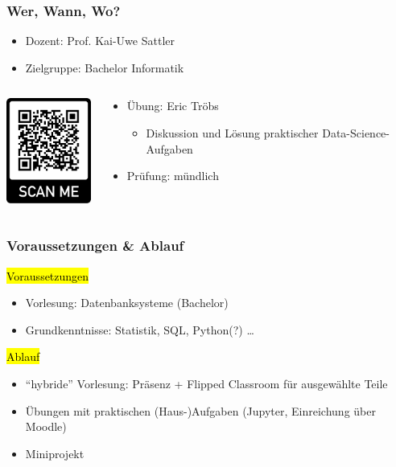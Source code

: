 \begin{frame}

    \frametitle{Wer, Wann, Wo?}
  
    \begin{itemize}
      \item Dozent: Prof. Kai-Uwe Sattler
      \item Zielgruppe: Bachelor Informatik
    \end{itemize}

    \begin{columns}
      \begin{column}{0.3\textwidth}
          \begin{center}
           \includegraphics[width=3cm]{fig1/qr-ds1.png}
           \end{center}
      \end{column}
      \begin{column}{0.7\textwidth}
    \begin{itemize}
    \item Übung: Eric Tröbs
      \begin{itemize}
      \item Diskussion und Lösung praktischer Data-Science-Aufgaben
      \end{itemize}
    \item Prüfung: mündlich
    \end{itemize}
  \end{column}
\end{columns}
\end{frame}
  
  
  \begin{frame}
  
    \frametitle{Voraussetzungen \& Ablauf}
  
  \hl{Voraussetzungen}
  \begin{itemize}
  \item Vorlesung: Datenbanksysteme (Bachelor)
  \item Grundkenntnisse: Statistik, SQL, Python(?) \dots
  \end{itemize}


  \hl{Ablauf}
  \begin{itemize}
    \item "`hybride"' Vorlesung: Präsenz + Flipped Classroom für ausgewählte Teile
    \item Übungen mit praktischen (Haus-)Aufgaben (Jupyter, Einreichung über Moodle)
    \item Miniprojekt
    \end{itemize}
  
  \end{frame}
  

